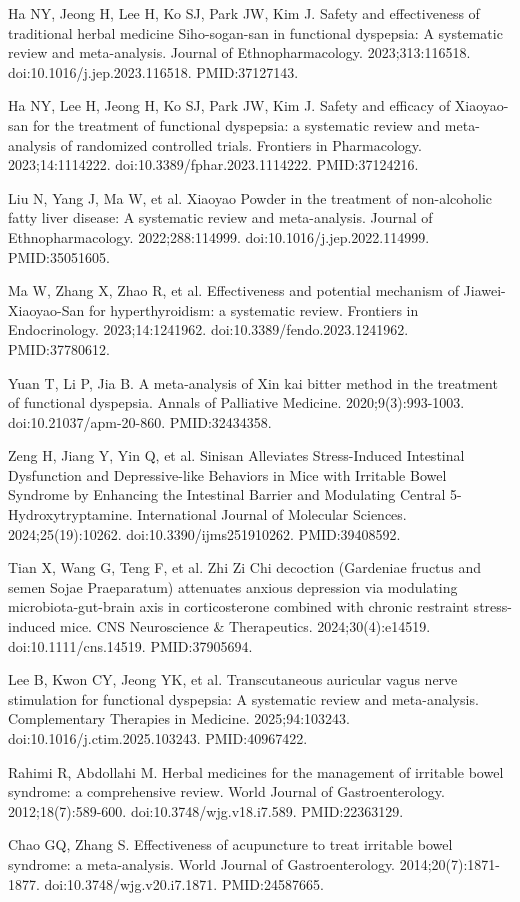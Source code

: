 \documentclass[11pt,oneside]{book}
\newcommand{\reff}[2]{\par\hangindent=7mm\hangafter=1\noindent[#1]\hspace{2mm}#2\par}
\begin{document}
\reff{34}{Ha NY, Jeong H, Lee H, Ko SJ, Park JW, Kim J. Safety and effectiveness of traditional herbal medicine Siho-sogan-san in functional dyspepsia: A systematic review and meta-analysis. Journal of Ethnopharmacology. 2023;313:116518. doi:10.1016/j.jep.2023.116518. PMID:37127143.}
\reff{35}{Ha NY, Lee H, Jeong H, Ko SJ, Park JW, Kim J. Safety and efficacy of Xiaoyao-san for the treatment of functional dyspepsia: a systematic review and meta-analysis of randomized controlled trials. Frontiers in Pharmacology. 2023;14:1114222. doi:10.3389/fphar.2023.1114222. PMID:37124216.}
\reff{36}{Liu N, Yang J, Ma W, et al. Xiaoyao Powder in the treatment of non-alcoholic fatty liver disease: A systematic review and meta-analysis. Journal of Ethnopharmacology. 2022;288:114999. doi:10.1016/j.jep.2022.114999. PMID:35051605.}
\reff{37}{Ma W, Zhang X, Zhao R, et al. Effectiveness and potential mechanism of Jiawei-Xiaoyao-San for hyperthyroidism: a systematic review. Frontiers in Endocrinology. 2023;14:1241962. doi:10.3389/fendo.2023.1241962. PMID:37780612.}
\reff{38}{Yuan T, Li P, Jia B. A meta-analysis of Xin kai bitter method in the treatment of functional dyspepsia. Annals of Palliative Medicine. 2020;9(3):993-1003. doi:10.21037/apm-20-860. PMID:32434358.}
\reff{39}{Zeng H, Jiang Y, Yin Q, et al. Sinisan Alleviates Stress-Induced Intestinal Dysfunction and Depressive-like Behaviors in Mice with Irritable Bowel Syndrome by Enhancing the Intestinal Barrier and Modulating Central 5-Hydroxytryptamine. International Journal of Molecular Sciences. 2024;25(19):10262. doi:10.3390/ijms251910262. PMID:39408592.}
\reff{40}{Tian X, Wang G, Teng F, et al. Zhi Zi Chi decoction (Gardeniae fructus and semen Sojae Praeparatum) attenuates anxious depression via modulating microbiota-gut-brain axis in corticosterone combined with chronic restraint stress-induced mice. CNS Neuroscience \& Therapeutics. 2024;30(4):e14519. doi:10.1111/cns.14519. PMID:37905694.}
\reff{41}{Lee B, Kwon CY, Jeong YK, et al. Transcutaneous auricular vagus nerve stimulation for functional dyspepsia: A systematic review and meta-analysis. Complementary Therapies in Medicine. 2025;94:103243. doi:10.1016/j.ctim.2025.103243. PMID:40967422.}
\reff{42}{Rahimi R, Abdollahi M. Herbal medicines for the management of irritable bowel syndrome: a comprehensive review. World Journal of Gastroenterology. 2012;18(7):589-600. doi:10.3748/wjg.v18.i7.589. PMID:22363129.}
\reff{43}{Chao GQ, Zhang S. Effectiveness of acupuncture to treat irritable bowel syndrome: a meta-analysis. World Journal of Gastroenterology. 2014;20(7):1871-1877. doi:10.3748/wjg.v20.i7.1871. PMID:24587665.}
\end{document}
